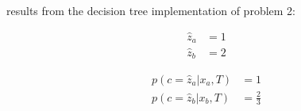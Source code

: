 results from the decision tree implementation of problem 2:

\begin{align*}
\hat z_a &= 1 \\
\hat z_b &= 2
\end{align*}

\begin{align*}
p(c= \hat z_a|x_a,T) &= 1 \\
p(c= \hat z_b|x_b,T) &= \frac{2}{3}
\end{align*}

